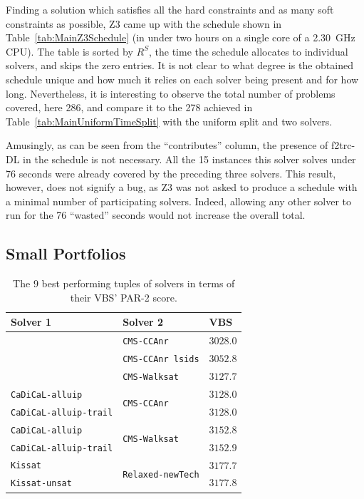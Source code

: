 \documentclass{elsarticle}
\newcommand{\solver}[1]{\texttt{#1}}
\begin{document}
Finding a solution which satisfies all the hard constraints and as many soft constraints as possible,
Z3 came up with the schedule shown in Table~\ref{tab:MainZ3Schedule} (in under two hours on a single core of a \SI{2.30}{\giga\hertz} CPU).
The table is sorted by $R^S$, the time the schedule allocates to individual solvers, and skips the zero entries.
It is not clear to what degree is the obtained schedule unique and how much it relies on each solver being present and for how long.
Nevertheless, it is interesting to observe the total number of problems covered, here 286,
and compare it to the 278 achieved in Table~\ref{tab:MainUniformTimeSplit} with the uniform split and two solvers.

Amusingly, as can be seen from the ``contributes'' column, the presence of f2trc-DL in the schedule
is not necessary.
All the 15 instances this solver solves under 76 seconds were already covered by the preceding three solvers.
This result, however, does not signify a bug, as Z3 was not asked to produce a schedule with a minimal number of
participating solvers.
Indeed, allowing any other solver to run for the 76 ``wasted'' seconds would not increase the overall total.


\subsection{Small Portfolios}

\begin{table}[tb]
\centering
\begin{tabular}{lll}
\bf Solver 1 & \bf Solver 2 & \bf VBS\\
\hline\arrayrulecolor{lightgray}
\multirow{3}{*}{\solver{Kissat}} & \solver{CMS-CCAnr} & $3028.0$\\
 & \solver{CMS-CCAnr lsids} & $3052.8$\\
 & \solver{CMS-Walksat} & $3127.7$\\
\hline
\solver{CaDiCaL-alluip} & \multirow{2}{*}{\solver{CMS-CCAnr}} & $3128.0$\\
\solver{CaDiCaL-alluip-trail} &  & $3128.0$\\
\solver{CaDiCaL-alluip} & \multirow{2}{*}{\solver{CMS-Walksat}} & $3152.8$\\
\solver{CaDiCaL-alluip-trail} &  & $3152.9$\\
\hline
\solver{Kissat} & \multirow{2}{*}{\solver{Relaxed-newTech}} & $3177.7$\\
\solver{Kissat-unsat} &  & $3177.8$
\end{tabular}
\caption{The $9$ best performing tuples of solvers in terms of their VBS' PAR-2 score.}
\label{tab:best-tuples}
\end{table}
\end{document}
